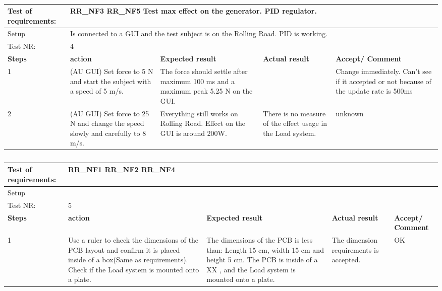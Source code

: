 \begin{table}[h!]
	\centering
	\label{my-label}	
	\begin{tabular}{|p{1.5 cm}|p{4.2 cm}|p{2.1 cm}|p{2.1 cm}|p{2.1 cm}|}
		\hline
		Test of requirements: 
		& \multicolumn{4}{l|}{RR\_NF3 RR\_NF5  Test max effect on the generator.	PID regulator.} \\ \hline
		Setup 
		& \multicolumn{4}{l|}{Is connected to a GUI and the test subject is on the Rolling Road. PID is working.} \\ \hline
		Test NR:
		& \multicolumn{4}{l|}{4} \\ \hline
		\textbf{Steps} & \textbf{action} & \textbf{Expected result} & 
		\textbf{Actual result} & \textbf{Accept/ Comment} \\ \hline
		1 
		& (AU GUI) Set force to 5 N and start the subject with a speed of 5 m/s. 
		& The force should settle after maximum 100 ms and a maximum peak 5.25 N on the GUI.  
		& 
		& Change immediately. Can't see if it accepted or not because of the update rate is 500ms\\ \hline
		2
		& (AU GUI) Set force to 25 N and change the speed slowly and carefully to 8 m/s. 
		& Everything still works on Rolling Road. Effect on the GUI is around 200W.
		& There is no measure of the effect usage in the Load system.
		& unknown \\ \hline
	\end{tabular}
	\caption{}
\end{table}

\begin{table}[h!]
	\centering
	\label{my-label}	
	\begin{tabular}{|p{1.5 cm}|p{4.2 cm}|p{2.1 cm}|p{2.1 cm}|p{2.1 cm}|}
		\hline
		Test of requirements: 
		& \multicolumn{4}{l|}{RR\_NF1 RR\_NF2 RR\_NF4} \\ \hline
		Setup 
		& \multicolumn{4}{l|}{} \\ \hline
		Test NR:
		& \multicolumn{4}{l|}{5} \\ \hline
		\textbf{Steps} & \textbf{action} & \textbf{Expected result} & 
		\textbf{Actual result} & \textbf{Accept/ Comment} \\ \hline
		1 
		& Use a ruler to check the dimensions of the PCB layout and confirm it is placed inside of a box(Same as requirements). Check if the Load system is mounted onto a plate.
		& The dimensions of the PCB is less than: Length 15 cm, width 15 cm and height 5 cm. The PCB is inside of a XX \fxnote{inside a box i guess? LB}, and the Load system is mounted onto a plate.
		& The dimension requirements is accepted.
		& OK\\ \hline
	\end{tabular}
	\caption{}
\end{table}


